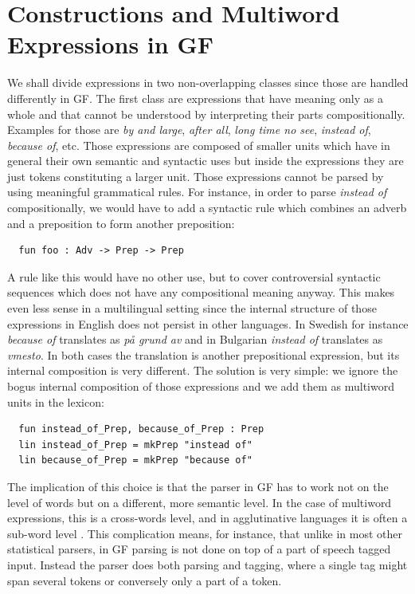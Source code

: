 \documentclass[output=paper]{LSP/langsci}
\begin{document}
\section{Constructions and Multiword Expressions in GF}
\label{mwe}

We shall divide expressions in two non-overlapping classes since 
those are handled differently in GF. The first class are expressions 
that have meaning only as a whole and that cannot be understood 
by interpreting their parts compositionally. 
Examples for those are \textit{by and large}, \textit{after all}, 
\textit{long time no see}, \textit{instead of}, \textit{because of}, etc.
Those expressions are composed of smaller units which have 
in general their own semantic and syntactic uses but inside 
the expressions they are just tokens constituting a larger unit.
Those expressions cannot be parsed by using meaningful grammatical rules.
For instance, in order to parse \textit{instead of} compositionally, 
we would have to add a syntactic rule which combines an adverb and 
a preposition to form another preposition:
\begin{verbatim}
  fun foo : Adv -> Prep -> Prep
\end{verbatim}
A rule like this would have no other use, but to cover controversial 
syntactic sequences which does not have any compositional meaning anyway.
This makes even less sense in a multilingual setting since the internal
structure of those expressions in English does not persist in other
languages. In Swedish for instance \textit{because of} translates as 
\textit{p{\aa} grund av} and in Bulgarian \textit{instead of} translates 
as \textit{vmesto}. In both cases the translation is 
another prepositional expression, but its internal composition 
is very different. The solution is very simple: we ignore 
the bogus internal composition of those expressions and we add them as 
multiword units in the lexicon:
\begin{verbatim}
  fun instead_of_Prep, because_of_Prep : Prep
  lin instead_of_Prep = mkPrep "instead of"
  lin because_of_Prep = mkPrep "because of"
\end{verbatim}

The implication of this choice is that the parser in 
GF \citep{angelov2011mechanics} has to work not on the level of words 
but on a different, more semantic level. In the case of 
multiword expressions, this is a cross-words level, and 
in agglutinative languages it is often a sub-word level \citep{angelov2015orthography}. 
This complication means, for instance, that unlike in
most other statistical parsers, in GF parsing is not done on top of 
a part of speech tagged input. Instead the parser does both parsing
and tagging, where a single tag might span several tokens or 
conversely only a part of a token.
\end{document}
